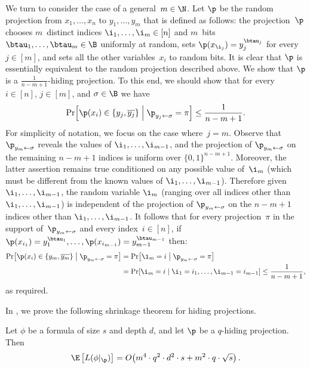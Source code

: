 \begin{example}
\label{ex:random-m-variables-alive}We turn to consider the case of a
general~$m\in\N$. Let $\p$ be the random projection from $x_{1},\ldots,x_{n}$
to $y_{1},\ldots,y_{m}$ that is defined as follows: the projection~$\p$
chooses $m$~distinct indices $\i_{1},\ldots,\i_{m}\in\left[n\right]$
and $m$~bits $\btau_{1},\ldots,\btau_{m}\in\B$ uniformly at random,
sets $\p(x_{\i_{j}})=y_{j}^{\btau_{j}}$ for every $j\in\left[m\right]$,
and sets all the other variables~$x_{i}$ to random bits. It is clear
that $\p$ is essentially equivalent to the random projection described
above. We show that $\p$ is a $\frac{1}{n-m+1}$-hiding projection.
To this end, we should show that for every~$i\in\left[n\right]$,
$j\in\left[m\right]$, and $\sigma\in\B$ we have 
\[
\Pr\!\left[\p(x_{i})\in\left\{ y_{j},\overline{y_{j}}\right\} \;\middle|\;\p_{y_{j}\gets\sigma}=\pi\right]\le\frac{1}{n-m+1}.
\]
For simplicity of notation, we focus on the case where~$j=m$. Observe
that $\p_{y_{m}\gets\sigma}$ reveals the values of $\i_{1},\ldots,\i_{m-1}$,
and the projection of $\p_{y_{m}\gets\sigma}$ on the remaining $n-m+1$
indices is uniform over $\{0,1\}^{n-m+1}$. Moreover, the latter assertion
remains true conditioned on any possible value of~$\i_{m}$ (which
must be different from the known values of $\i_{1},\ldots,\i_{m-1}$).
Therefore given $\i_{1},\ldots,\i_{m-1}$, the random variable $\i_{m}$
(ranging over all indices other than $\i_{1},\ldots,\i_{m-1}$) is
independent of the projection of $\p_{y_{m}\gets\sigma}$ on the $n-m+1$
indices other than $\i_{1},\ldots,\i_{m-1}$. It follows that for
every projection~$\pi$ in the support of~$\p_{y_{m}\gets\sigma}$
and every index~$i\in\left[n\right]$, if $\p(x_{i_{1}})=y_{1}^{\btau_{1}},\ldots,\p(x_{i_{m-1}})=y_{m-1}^{\btau_{m-1}}$
then: 
\begin{align*}
\Pr\!\left[\p(x_{i})\in\left\{ y_{m},\overline{y_{m}}\right\} \;\middle|\;\p_{y_{m}\gets\sigma}=\pi\right] & =\Pr\!\left[\i_{m}=i\;\middle|\;\p_{y_{m}\gets\sigma}=\pi\right]\\
 & =\Pr\!\left[\i_{m}=i\;\middle|\;\i_{1}=i_{1},\ldots,\i_{m-1}=i_{m-1}\right]\le\frac{1}{n-m+1},
\end{align*}
as required.
\end{example}

In , we prove the following shrinkage theorem
for hiding projections. 
\begin{theorem}
\label{thm:shrinkage-hiding}Let $\phi$ be a formula of size $s$ and
depth $d$, and let $\p$ be a $q$-hiding projection. Then 
\[
\E\left[L(\phi|_{\p})\right]=O\!\left(m^{4}\cdot q^{2}\cdot d^{2}\cdot s+m^{2}\cdot q\cdot\sqrt{s}\right).
\]
\end{theorem}

